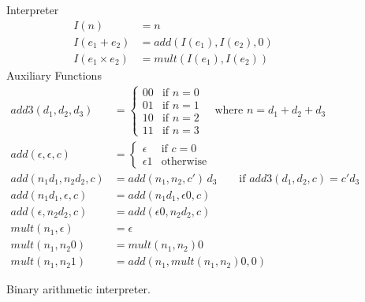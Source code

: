 \documentclass{tufte-handout}
\newcommand{\BR}[1]{(#1)}
\begin{document}
\begin{figure}
\noindent Interpreter 
\begin{align*}
I\BR{ n } &= n \\
I\BR{ e_1 + e_2 } &=
  \mathit{add}(I\BR{ e_1 }, I\BR{ e_2 },0) \\
I\BR{ e_1 \times e_2 } &=
  \mathit{mult}(I\BR{ e_1 }, I\BR{ e_2 })
\end{align*}
Auxiliary Functions
\begin{align*}
  \mathit{add3}(d_1, d_2, d_3) &= 
  \begin{cases}
     00 &  \text{if } n = 0 \\
     01 &  \text{if } n = 1 \\
     10 &  \text{if } n = 2 \\
     11 &  \text{if } n = 3
  \end{cases}
\quad \text{where } n = d_1 + d_2 + d_3 \\[1ex]
 \mathit{add}(\epsilon, \epsilon, c) &= 
   \begin{cases}
      \epsilon  & \text{if } c = 0 \\
      \epsilon 1  & \text{otherwise}
   \end{cases}
   \\
  \mathit{add}(n_1 d_1 , n_2 d_2, c) &= 
   \mathit{add}(n_1, n_2, c')\,d_3
  \qquad \text{if } \mathit{add3}(d_1, d_2, c) = c' d_3 \\
\mathit{add}(n_1 d_1 , \epsilon, c) &= 
  \mathit{add}(n_1 d_1 , \epsilon 0, c) \\
\mathit{add}(\epsilon, n_2 d_2, c) &= 
  \mathit{add}( \epsilon 0, n_2 d_2,c) \\[1ex]
 \mathit{mult}(n_1, \epsilon) &= \epsilon \\
 \mathit{mult}(n_1, n_2 0) &= \mathit{mult}(n_1,n_2) 0 \\
 \mathit{mult}(n_1, n_2 1) &= 
  \mathit{add}(n_1, \mathit{mult}(n_1,n_2)0, 0) 
\end{align*}
\caption{Binary arithmetic interpreter.}
\label{fig:interp-binary}
\end{figure}
\end{document}
